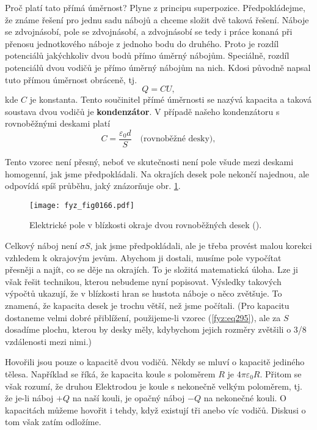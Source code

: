   Proč platí tato přímá úměrnost? Plyne z principu superpozice. Předpokládejme, že známe řešení pro 
  jednu sadu nábojů a chceme složit dvě taková řešení. Náboje se zdvojnásobí, pole se zdvojnásobí, 
  a zdvojnásobí se tedy i práce konaná při přenosu jednotkového náboje z jednoho bodu do druhého. 
  Proto je rozdíl potenciálů jakýchkoliv dvou bodů přímo úměrný nábojům. Speciálně, rozdíl 
  potenciálů dvou vodičů je přímo úměrný nábojům na nich. Kdosi původně napsal tuto přímou úměrnost 
  obráceně, tj.
  \begin{equation}\label{fyz:eq294}
    Q = CU,
  \end{equation}
  kde \(C\) je konstanta. Tento součinitel přímé úměrnosti se nazývá kapacita a taková soustava 
  dvou vodičů je \textbf{kondenzátor}. V případě našeho kondenzátoru s rovnoběžnými deskami platí
  \begin{equation}\label{fyz:eq295}
    C = \frac{\varepsilon_0d}{S} \quad\text{(rovnoběžné desky)},
  \end{equation}
  
  Tento vzorec není přesný, neboť ve skutečnosti není pole všude mezi deskami homogenní, jak jsme 
  předpokládali. Na okrajích desek pole nekončí najednou, ale odpovídá spíš průběhu,
  jaký znázorňuje obr. \ref{fyz:fig0166}.
  
  \begin{figure}[ht!]  %
    \centering
    \texttt{[image: fyz\_fig0166.pdf]}
    \caption{Elektrické pole v blízkosti okraje dvou rovnoběžných desek
             (\cite[s.~115]{Feynman02}).}
    \label{fyz:fig0166}
  \end{figure}

  Celkový náboj není \(σS\), jak jsme předpokládali, ale je třeba provést malou korekci vzhledem k
  okrajovým jevům. Abychom ji dostali, musíme pole vypočítat přesněji a najít, co se děje na
  okrajích. To je složitá matematická úloha. Lze ji však řešit technikou, kterou nebudeme nyní
  popisovat. Výsledky takových výpočtů ukazují, že v blízkosti hran se hustota náboje o něco
  zvětšuje. To znamená, že kapacita desek je trochu větší, než jsme počítali. (Pro kapacitu
  dostaneme velmi dobré přiblížení, použijeme-li vzorec (\ref{fyz:eq295}), ale za \(S\) dosadíme
  plochu, kterou by desky měly, kdybychom jejich rozměry zvětšili o 3/8 vzdálenosti mezi nimi.)
  
  Hovořili jsou pouze o kapacitě dvou vodičů. Někdy se mluví o kapacitě jediného tělesa. Například
  se říká, že kapacita koule s poloměrem \(R\) je \(4π\varepsilon_0R\). Přitom se však rozumí, že druhou
  Elektrodou je koule s nekonečně velkým poloměrem, tj. že je-li náboj \(+Q\) na naší kouli, je
  opačný náboj \(-Q\) na nekonečné kouli. O kapacitách můžeme hovořit i tehdy, když existují tři
  anebo víc vodičů. Diskusi o tom však zatím odložíme.

